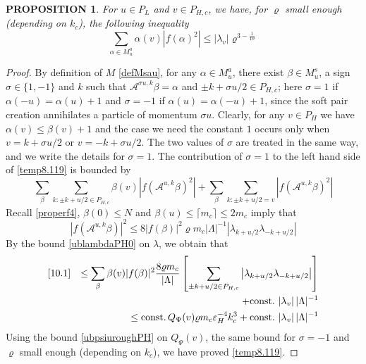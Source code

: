 \documentclass[11pt]{article}
\numberwithin{equation}{section}
\newcommand{\beq}{\begin{equation}}
\newcommand{\eeq}{\end{equation}}
\newcommand{\beqa}{\begin{eqnarray}}
\newcommand{\eeqa}{\end{eqnarray}}
\newcommand\eps{\varepsilon}
\newcommand\const{{\rm const.\, }}
\newcommand\al{{\alpha}}
\newcommand\be{\beta}
\renewcommand\rho\varrho
\newtheorem{prop}{PROPOSITION}[section]
\theoremstyle{definition}
\begin{document}
\begin{prop} For $u\in P_L$ and $v\in P_{H,c}$, we have, for $\rho$ small enough (depending on $k_c$), the following inequality
\beq\label{temp8.119}
\sum_{\al\in M_u^a}\al(v)\left|f(\al)^2\right|\leq \left|\lambda_v\right|\rho^{3-\frac{1}{10}}
\eeq\end{prop}
\begin{proof} By definition of $M$ \eqref{defMsau}, for any $\al\in M_u^a$, there exist $\be\in M_u^s$, a sign $\sigma\in\{1,-1\}$ and $k$ such that $\mathcal A^{\sigma u,k}\be=\al$ and $\pm k+\sigma u/2\in P_{H,c}$; here $\sigma=1$ if $\al(-u)=\al(u)+1$ and $\sigma=-1$ if $\al(u)=\al(-u)+1$, since the soft pair creation annihilates a particle of momentum $\sigma u$. Clearly, for any $v \in P_{H}$ we have
$\alpha(v) \le \beta(v) +1$ and the case we need the constant $1$ occurs only when  $v=k+\sigma u/2 $ or
$v= - k+\sigma u/2$. The two values of $\sigma$ are treated in the same way, and we write the details for $\sigma=1$. The contribution of $\sigma=1$ to the left hand side of \eqref{temp8.119} is bounded by
\beq\label{10.1}
 \sum_{\be}\sum_{k:\pm k+u/2\in P_{H,c}}\be(v)|f(\mathcal A^{u,k}\be)^2|+\sum_{\be}\sum_{k:\pm k+u/2=v}|f(\mathcal A^{u,k}\be)^2|
\eeq
Recall   \eqref{properf4},   $\be(0)\leq N$ and $\be(u)\leq \lceil m_c\rceil\leq 2m_c$ imply that
\beq
|f(\mathcal A^{u,k}\be)|^2\leq 8|f(\be)|^2\rho m_c|\Lambda|^{-1}\left|\lambda_{k+u/2}\lambda_{-k+u/2}\right|
\eeq
By  the bound \eqref{ublambdaPH0} on $\lambda$, we obtain that
\beqa\nonumber
\eqref{10.1}&&\leq \sum_{\be}\be(v)|f(\be)|^2\frac{8\rho m_c}{|\Lambda|}\left[\sum_{\pm k+u/2\in P_{H,c}}\left|\lambda_{k+u/2}\lambda_{-k+u/2}\right|\right]\\\nonumber
&&\quad+\const\left|\lambda_v\right||\Lambda|^{-1}\\
&&\leq \const Q_\Psi(v)\rho m_c\eps_H^{-4}k_c^3+\const\left|\lambda_v\right||\Lambda|^{-1}
\eeqa
Using the bound \eqref{ubpsiuroughPH} on $Q_\Psi(v)$, the same bound for $\sigma=-1$ and $\rho$ small enough (depending on $k_c$), we have proved  \eqref{temp8.119}.
\end{proof}
\end{document}
